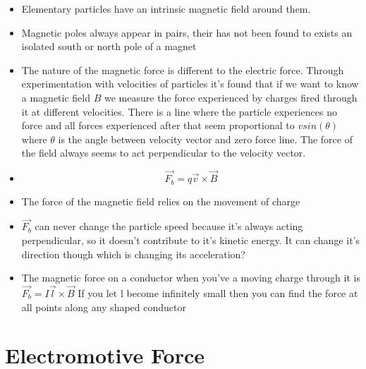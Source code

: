 \documentclass[11pt]{article}
\begin{document}
\begin{itemize}
\tightlist
\item
  Elementary particles have an intrinsic magnetic field around them.
\item
  Magnetic poles always appear in pairs, their has not been found to
  exists an isolated south or north pole of a magnet
\item
  The nature of the magnetic force is different to the electric force.
  Through experimentation with velocities of particles it's found that
  if we want to know a magnetic field \(B\) we measure the force
  experienced by charges fired through it at different velocities. There
  is a line where the particle experiences no force and all forces
  experienced after that seem proportional to \(vsin(\theta)\) where
  \(\theta\) is the angle between velocity vector and zero force line.
  The force of the field always seems to act perpendicular to the
  velocity vector.
\item
  \[\vec{F_b} = q\vec{v} \times \vec{B}\]
\item
  The force of the magnetic field relies on the movement of charge
\item
  \(\vec{F_b}\) can never change the particle speed because it's always
  acting perpendicular, so it doesn't contribute to it's kinetic energy.
  It can change it's direction though which is changing its
  acceleration?
\item
  The magnetic force on a conductor when you've a moving charge through
  it is \(\vec{F_b} = I\vec{l} \times \vec{B}\) If you let l become
  infinitely small then you can find the force at all points along any
  shaped conductor
\end{itemize}

\hypertarget{electromotive-force}{%
\section{Electromotive Force}\label{electromotive-force}}
\end{document}
